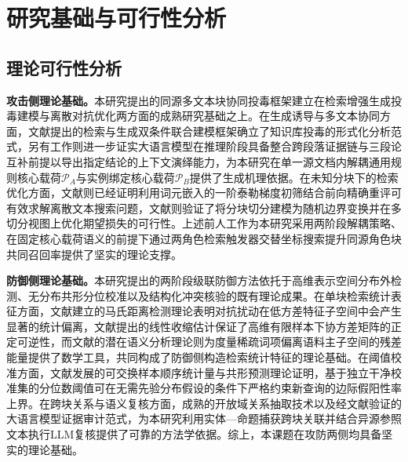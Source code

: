 \section{研究基础与可行性分析}

\subsection{理论可行性分析}


\textbf{攻击侧理论基础。}本研究提出的同源多文本块协同投毒框架建立在检索增强生成投毒建模与离散对抗优化两方面的成熟研究基础之上。在生成诱导与多文本协同方面，文献\cite{zou2025poisonedrag}提出的检索与生成双条件联合建模框架确立了知识库投毒的形式化分析范式，另有工作\cite{chang2025oneshot,zhang2026inceptionrag}则进一步证实大语言模型在推理阶段具备整合跨段落证据链与三段论互补前提以导出指定结论的上下文演绎能力，为本研究在单一源文档内解耦通用规则核心载荷$\mathcal P_A$与实例绑定核心载荷$\mathcal P_B$提供了生成机理依据。在未知分块下的检索优化方面，文献\cite{ebrahimi-etal-2018-hotflip,zou2023universal}则已经证明利用词元嵌入的一阶泰勒梯度初筛结合前向精确重评可有效求解离散文本搜索问题，文献\cite{nie2026crcp}则验证了将分块切分建模为随机边界变换并在多切分视图上优化期望损失的可行性。上述前人工作为本研究采用两阶段解耦策略、在固定核心载荷语义的前提下通过两角色检索触发器交替坐标搜索提升同源角色块共同召回率提供了坚实的理论支撑。

\textbf{防御侧理论基础。}本研究提出的两阶段级联防御方法依托于高维表示空间分布外检测、无分布共形分位校准以及结构化冲突核验的既有理论成果。在单块检索统计表征方面，文献\cite{mahalanobis1936generalized,lee2018simple}建立的马氏距离检测理论表明对抗扰动在低方差特征子空间中会产生显著的统计偏离，文献\cite{ledoit2004well}提出的线性收缩估计保证了高维有限样本下协方差矩阵的正定可逆性，而文献\cite{deerwester1990indexing}的潜在语义分析理论则为度量稀疏词项偏离语料主子空间的残差能量提供了数学工具，共同构成了防御侧构造检索统计特征的理论基础。在阈值校准方面，文献\cite{vovk2005algorithmic,angelopoulos2023conformal}发展的可交换样本顺序统计量与共形预测理论证明，基于独立干净校准集的分位数阈值可在无需先验分布假设的条件下严格约束新查询的边际假阳性率上界。在跨块关系与语义复核方面，成熟的开放域关系抽取技术\cite{honnibal2020spacy,angeli2015leveraging}以及经文献\cite{chiang2023judging,zhang2025traceback,yin2026rade}验证的大语言模型证据审计范式，为本研究利用实体—命题捕获跨块关联并结合异源参照文本执行LLM复核提供了可靠的方法学依据。综上，本课题在攻防两侧均具备坚实的理论基础。

